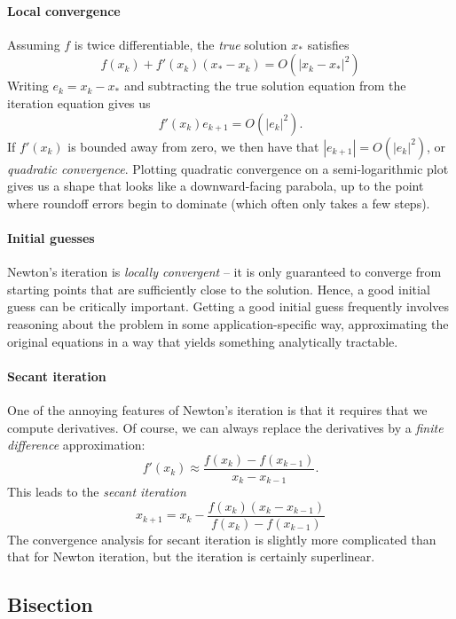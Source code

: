 \documentclass[12pt, leqno]{article}
\begin{document}
\paragraph{Local convergence}
Assuming $f$ is twice differentiable, the {\em true} solution $x_*$ satisfies
\[
  f(x_k) + f'(x_k) (x_*-x_k) = O(|x_k-x_*|^2)
\]
Writing $e_k = x_k-x_*$ and subtracting the true solution equation
from the iteration equation gives us
\[
  f'(x_k) e_{k+1} = O(|e_k|^2).
  \]
If $f'(x_k)$ is bounded away from zero, we then have that $|e_{k+1}| =
O(|e_k|^2)$, or {\em quadratic convergence}.  Plotting quadratic
convergence on a semi-logarithmic plot gives us a shape that looks
like a downward-facing parabola, up to the point where roundoff errors
begin to dominate (which often only takes a few steps).

\paragraph{Initial guesses}
Newton's iteration is {\em locally convergent} -- it is only
guaranteed to converge from starting points that are sufficiently
close to the solution.  Hence, a good initial guess can be critically
important.  Getting a good initial guess frequently involves reasoning
about the problem in some application-specific way, approximating the
original equations in a way that yields something analytically
tractable.

\paragraph{Secant iteration}
One of the annoying features of Newton's iteration is that
it requires that we compute derivatives.  Of course, we
can always replace the derivatives by a {\em finite difference}
approximation:
\[
  f'(x_{k}) \approx \frac{f(x_k)-f(x_{k-1})}{x_k-x_{k-1}}.
\]
This leads to the {\em secant iteration}
\[
  x_{k+1} = x_k - \frac{f(x_k)(x_k-x_{k-1})}{f(x_k)-f(x_{k-1})}
\]
The convergence analysis for secant iteration is slightly more
complicated than that for Newton iteration, but the iteration
is certainly superlinear.

\subsection{Bisection}
\end{document}
